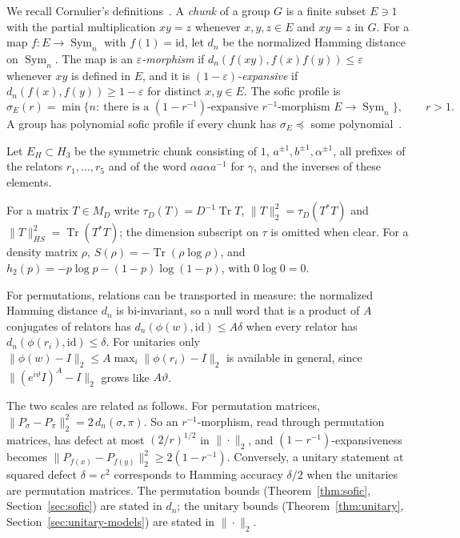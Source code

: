 \documentclass[11pt,a4paper]{article}
\theoremstyle{plain}
\theoremstyle{definition}
\theoremstyle{remark}
\DeclareMathOperator{\Tr}{Tr}
\DeclareMathOperator{\Sym}{Sym}
\begin{document}
We recall Cornulier's definitions~\cite[Definitions~3.2 and~3.4]{Cornulier2013}. A \emph{chunk} of a group $G$ is a finite
subset $E\ni1$ with the partial multiplication $xy=z$ whenever $x,y,z\in E$ and $xy=z$ in $G$. For a map
$f:E\to\Sym_n$ with $f(1)=\mathrm{id}$, let $d_n$ be the normalized Hamming distance on $\Sym_n$. The map is an
\emph{$\varepsilon$-morphism} if $d_n(f(xy),f(x)f(y))\le\varepsilon$ whenever $xy$ is defined in $E$, and it is
\emph{$(1-\varepsilon)$-expansive} if $d_n(f(x),f(y))\ge1-\varepsilon$ for distinct $x,y\in E$. The sofic profile is
\[
\sigma_E(r)=\min\{n:\ \text{there is a }(1-r^{-1})\text{-expansive }r^{-1}\text{-morphism }E\to\Sym_n\},\qquad r>1.
\]
A group has polynomial sofic profile if every chunk has $\sigma_E\preceq$ some polynomial~\cite[Definition~3.10]{Cornulier2013}.

Let $E_H\subset H_3$ be the symmetric chunk consisting of $1$, $a^{\pm1},b^{\pm1},\alpha^{\pm1}$, all prefixes of the relators
$r_1,\dots,r_5$ and of the word $\alpha a\alpha a^{-1}$ for $\gamma$, and the inverses of these elements.

For a matrix $T\in M_D$ write $\tau_D(T)=D^{-1}\Tr T$,
$\|T\|_2^2=\tau_D(T^*T)$ and $\|T\|_{HS}^2=\Tr(T^*T)$; the dimension subscript on $\tau$ is omitted when clear.
For a density matrix $\rho$, $S(\rho)=-\Tr(\rho\log\rho)$, and
$h_2(p)=-p\log p-(1-p)\log(1-p)$, with $0\log0=0$.

For permutations, relations can be transported in measure: the normalized Hamming distance $d_n$ is bi-invariant, so a
null word that is a product of $A$ conjugates of relators has $d_n(\phi(w),\mathrm{id})\le A\delta$ when every relator has
$d_n(\phi(r_i),\mathrm{id})\le\delta$. For unitaries only $\|\phi(w)-I\|_2\le A\max_i\|\phi(r_i)-I\|_2$ is available in general, since
$\|(e^{i\vartheta}I)^A-I\|_2$ grows like $A\vartheta$.

The two scales are related as follows. For permutation matrices,
$\|P_\sigma-P_\pi\|_2^2 = 2\,d_n(\sigma,\pi)$. So an $r^{-1}$-morphism, read through permutation matrices, has defect at most $(2/r)^{1/2}$ in
$\|\cdot\|_2$, and $(1-r^{-1})$-expansiveness becomes $\|P_{f(x)}-P_{f(y)}\|_2^2\ge2(1-r^{-1})$. Conversely, a unitary statement at squared defect
$\delta = e^2$ corresponds to Hamming accuracy $\delta/2$ when the unitaries are permutation matrices. The permutation bounds
(Theorem~\ref{thm:sofic}, Section~\ref{sec:sofic}) are stated in $d_n$; the unitary bounds (Theorem~\ref{thm:unitary},
Section~\ref{sec:unitary-models}) are stated in $\|\cdot\|_2$.
\end{document}
